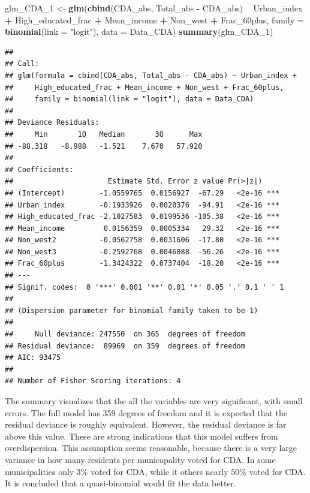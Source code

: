 \documentclass[11pt,]{article}
\newenvironment{Shaded}{\begin{snugshade}}{\end{snugshade}}
\newcommand{\KeywordTok}[1]{\textcolor[rgb]{0.13,0.29,0.53}{\textbf{#1}}}
\newcommand{\DataTypeTok}[1]{\textcolor[rgb]{0.13,0.29,0.53}{#1}}
\newcommand{\DecValTok}[1]{\textcolor[rgb]{0.00,0.00,0.81}{#1}}
\newcommand{\StringTok}[1]{\textcolor[rgb]{0.31,0.60,0.02}{#1}}
\newcommand{\OperatorTok}[1]{\textcolor[rgb]{0.81,0.36,0.00}{\textbf{#1}}}
\newcommand{\NormalTok}[1]{#1}
\begin{document}
\begin{Shaded}
\begin{Highlighting}[]
\NormalTok{glm_CDA_}\DecValTok{1}\NormalTok{ <-}\StringTok{ }\KeywordTok{glm}\NormalTok{(}\KeywordTok{cbind}\NormalTok{(CDA_abs, Total_abs }\OperatorTok{-}\StringTok{ }\NormalTok{CDA_abs) }\OperatorTok{~}\StringTok{ }\NormalTok{Urban_index }\OperatorTok{+}\StringTok{ }\NormalTok{High_educated_frac }\OperatorTok{+}\StringTok{ }
\StringTok{    }\NormalTok{Mean_income }\OperatorTok{+}\StringTok{ }\NormalTok{Non_west }\OperatorTok{+}\StringTok{ }\NormalTok{Frac_60plus, }\DataTypeTok{family =} \KeywordTok{binomial}\NormalTok{(}\DataTypeTok{link =} \StringTok{"logit"}\NormalTok{), }
    \DataTypeTok{data =}\NormalTok{ Data_CDA)}
\KeywordTok{summary}\NormalTok{(glm_CDA_}\DecValTok{1}\NormalTok{)}
\end{Highlighting}
\end{Shaded}

\begin{verbatim}
## 
## Call:
## glm(formula = cbind(CDA_abs, Total_abs - CDA_abs) ~ Urban_index + 
##     High_educated_frac + Mean_income + Non_west + Frac_60plus, 
##     family = binomial(link = "logit"), data = Data_CDA)
## 
## Deviance Residuals: 
##     Min       1Q   Median       3Q      Max  
## -88.318   -8.988   -1.521    7.670   57.920  
## 
## Coefficients:
##                      Estimate Std. Error z value Pr(>|z|)    
## (Intercept)        -1.0559765  0.0156927  -67.29   <2e-16 ***
## Urban_index        -0.1933926  0.0020376  -94.91   <2e-16 ***
## High_educated_frac -2.1027583  0.0199536 -105.38   <2e-16 ***
## Mean_income         0.0156359  0.0005334   29.32   <2e-16 ***
## Non_west2          -0.0562758  0.0031606  -17.80   <2e-16 ***
## Non_west3          -0.2592768  0.0046088  -56.26   <2e-16 ***
## Frac_60plus        -1.3424322  0.0737404  -18.20   <2e-16 ***
## ---
## Signif. codes:  0 '***' 0.001 '**' 0.01 '*' 0.05 '.' 0.1 ' ' 1
## 
## (Dispersion parameter for binomial family taken to be 1)
## 
##     Null deviance: 247550  on 365  degrees of freedom
## Residual deviance:  89969  on 359  degrees of freedom
## AIC: 93475
## 
## Number of Fisher Scoring iterations: 4
\end{verbatim}

The summary visualizes that the all the variables are very significant,
with small errors. The full model has 359 degrees of freedom and it is
expected that the residual deviance is roughly equivalent. However, the
residual deviance is far above this value. These are strong indications
that this model suffers from overdispersion. This assumption seems
reasonable, because there is a very large variance in how many residents
per municapality voted for CDA. In some municipalities only 3\% voted
for CDA, while it others nearly 50\% voted for CDA. It is concluded that
a quasi-binomial would fit the data better.
\end{document}
